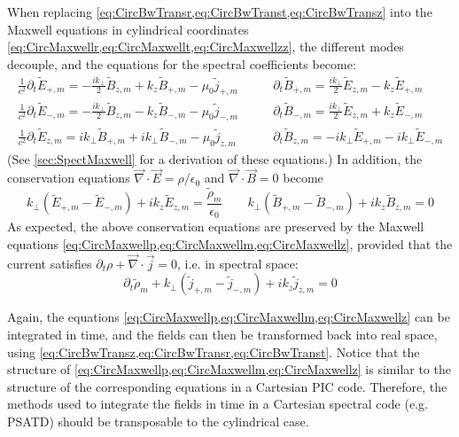 \documentclass[a4paper]{article}   	%
\begin{document}
When replacing \cref{eq:CircBwTransr,eq:CircBwTranst,eq:CircBwTransz} into the Maxwell equations in cylindrical
coordinates \cref{eq:CircMaxwellr,eq:CircMaxwellt,eq:CircMaxwellzz},
the different modes decouple, and the equations for the spectral
coefficients become:
\begin{align}
\frac{1}{c^2}\partial_t \tilde{E}_{+,m} = - \frac{ik_\perp }{2}\tilde{B}_{z,m} + k_z\tilde{B}_{+,m} - \mu_0\tilde{j}_{+,m} \qquad &   
\partial_t \tilde{B}_{+,m} = \frac{ik_\perp }{2} \tilde{E}_{z,m} - k_z
\tilde{E}_{+,m} 
\label{eq:CircMaxwellp} \\
\frac{1}{c^2}\partial_t \tilde{E}_{-,m} = -\frac{ik_\perp }{2} \tilde{B}_{z,m} - k_z \tilde{B}_{-,m} - \mu_0  \tilde{j}_{-,m} \qquad &   
\partial_t \tilde{B}_{-,m} = \frac{ik_\perp }{2} \tilde{E}_{z,m} + k_z
\tilde{E}_{-,m} \label{eq:CircMaxwellm} \\
\frac{1}{c^2}\partial_t \tilde{E}_{z,m} = ik_\perp  \tilde{B}_{+,m} + ik_\perp \tilde{B}_{-,m}  - \mu_0 \tilde{j}_{z,m}  \qquad & 
\partial_t \tilde{B}_{z,m} = -ik_\perp  \tilde{E}_{+,m} - ik_\perp \tilde{E}_{-,m}  \label{eq:CircMaxwellz} 
\end{align}
(See \cref{sec:SpectMaxwell} for a derivation of these equations.) In
addition, the conservation equations
$\vec{\nabla}\cdot\vec{E}=\rho/\epsilon_0$ and
$\vec{\nabla}\cdot\vec{B} = 0$
become
\begin{equation}
\label{eq:SpectCons}
k_\perp (\tilde{E}_{+,m} -\tilde{E}_{-,m}) + ik_z \tilde{E}_{z,m} =
\frac{\tilde{\rho}_m}{\epsilon_0} \qquad
 k_\perp (\tilde{B}_{+,m} -\tilde{B}_{-,m}) + ik_z \tilde{B}_{z,m} =
0 \end{equation}
As expected, the above conservation equations are
preserved by the Maxwell equations
\cref{eq:CircMaxwellp,eq:CircMaxwellm,eq:CircMaxwellz}, provided
that the current satisfies $\partial_t
\rho + \vec{\nabla} \cdot \vec{j} = 0$, i.e. in spectral space:
\begin{equation}
\label{eq:SpectCharge}
\partial_t \tilde{\rho}_m + k_\perp (\tilde{j}_{+,m} -\tilde{j}_{-,m}) + ik_z
\tilde{j}_{z,m} = 0
\end{equation}  

Again, the equations \cref{eq:CircMaxwellp,eq:CircMaxwellm,eq:CircMaxwellz}  can be
integrated in time, and the fields can then be transformed back into
real space, using \cref{eq:CircBwTransz,eq:CircBwTransr,eq:CircBwTranst}. Notice that
the structure of \cref{eq:CircMaxwellp,eq:CircMaxwellm,eq:CircMaxwellz} is similar to
the structure of the corresponding equations in a Cartesian PIC code. Therefore,
the methods used to integrate the fields in time in a Cartesian
spectral code (e.g. PSATD) should be transposable to the cylindrical case.
\end{document}
